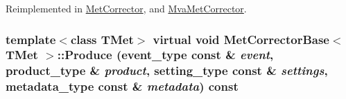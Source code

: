 Reimplemented in \hyperlink{classMetCorrector_a6ee5bc3ba9731e73c395057f47e86f67}{MetCorrector}, and \hyperlink{classMvaMetCorrector_a82861f8921f0f9d792acd4f79ef1cff5}{MvaMetCorrector}.\hypertarget{classMetCorrectorBase_a06f1a4a2b3884caa0a01ef47654e3040}{
\subsubsection[{Produce}]{\setlength{\rightskip}{0pt plus 5cm}template$<$class TMet$>$ virtual void {\bf MetCorrectorBase}$<$ TMet $>$::Produce (event\_\-type const \& {\em event}, \/  product\_\-type \& {\em product}, \/  setting\_\-type const \& {\em settings}, \/  metadata\_\-type const \& {\em metadata}) const}}
\label{classMetCorrectorBase_a06f1a4a2b3884caa0a01ef47654e3040}


